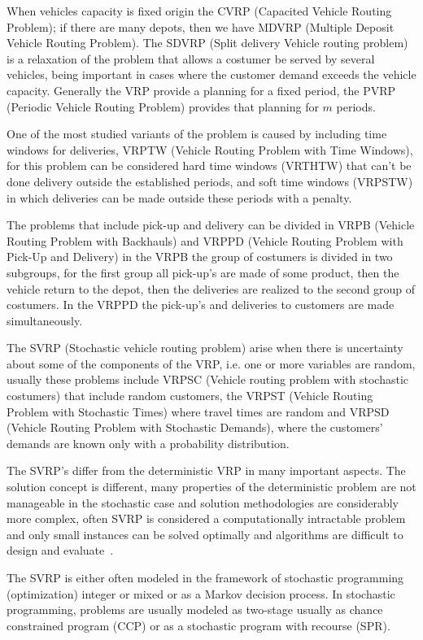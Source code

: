 When vehicles capacity is fixed origin the CVRP (Capacited Vehicle Routing Problem); if there are many depots, then we have MDVRP (Multiple Deposit Vehicle Routing Problem). The SDVRP (Split delivery Vehicle routing problem) is a relaxation of the problem that allows a costumer be served by several vehicles, being important in cases where the customer demand exceeds the vehicle capacity. Generally the VRP provide a planning for a fixed period, the PVRP (Periodic Vehicle Routing Problem) provides that planning for $m$ periods.

One of the most studied variants of the problem is caused by including time windows for deliveries, VRPTW (Vehicle Routing Problem with Time Windows), for this problem can be considered hard time windows (VRTHTW) that can't be done delivery outside the established periods, and soft time windows (VRPSTW) in which deliveries can be made outside these periods with a penalty.

The problems that include pick-up and delivery can be divided in VRPB (Vehicle Routing Problem with Backhauls) and VRPPD (Vehicle Routing Problem with Pick-Up and Delivery) in the VRPB the group of costumers is divided in two subgroups, for the first group all pick-up's are made of some product, then the vehicle return to the depot, then the deliveries are realized to the second group of costumers.  In the VRPPD the pick-up's and deliveries to customers are made simultaneously.

The SVRP (Stochastic vehicle routing problem) arise when there is uncertainty about some of the components of the VRP, i.e. one or more variables are random, usually these problems include VRPSC (Vehicle routing problem with stochastic costumers) that include random customers, the VRPST (Vehicle Routing Problem with Stochastic Times) where travel times are random and VRPSD (Vehicle Routing Problem with Stochastic Demands), where the customers' demands are known only with a probability distribution.

The SVRP's differ from the deterministic VRP in many important aspects. The solution concept is different, many properties of the deterministic problem are not manageable in the stochastic case and solution methodologies are considerably more complex, often SVRP is considered a computationally intractable problem and only small instances can be solved optimally and algorithms are difficult to design and evaluate~\cite{gendreau_stochastic_1996}.

The SVRP is either often modeled in the framework of stochastic programming (optimization) integer or mixed or as a Markov decision process. In stochastic programming, problems are usually modeled as two-stage usually as chance constrained program (CCP) or as a stochastic program with recourse (SPR).


